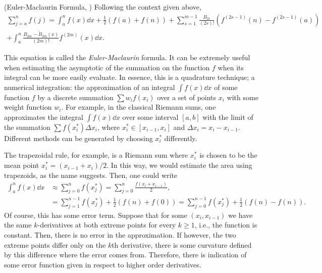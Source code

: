 \begin{teorema} (Euler-Maclaurin Formula,  \cite{NISTMathFunc})
	Following the context given above, 
	\begin{multline}
		\sum_{j=a}^{n} f(j) = \int_{a}^{n} f(x) \dd x + \frac{1}{2} \left(f(a) + f(n)\right) + \sum_{s=1}^{m-1} \frac{B_{2s}}{(2s)!} \left( f^{(2s-1)}(n) - f^{(2s-1)}(a)\right) \\ + \int_{a}^{n} \frac{B_{2m} - \tilde{B}_{2m}(x)}{(2m)!} f^{(2m)}(x) \dd x.
	\end{multline}
\end{teorema}


This equation is called the \textit{Euler-Maclaurin} formula. It can be extremely useful when estimating the asymptotic of the summation on the function $f$ when its integral can be more easily evaluate. In essence, this is a quadrature technique; a numerical integration: the approximation of an integral $\int f(x) \dd x$ of some function $f$ by a discrete summation $\sum w_i f(x_i)$ over a set of points $x_i$ with some weight function $w_i$. For example, in the classical Riemann sums, one approximates the integral $\int f(x) \dd x$ over some interval $[a,b]$ with the limit of the summation $\sum f(x_i^*) \Delta x_i$, where $x_i^* \in [x_{i-1}, x_i]$ and $ \Delta x_i = x_i - x_{i-1}$. Different methods can be generated by choosing $x_i^*$ differently.

The trapezoidal rule, for example, is a Riemann sum where $x_i^*$ is chosen to be the mean point $x_i^* = (x_{i-1} + x_i)/2$. In this way, we would estimate the area using trapezoids, as the name suggests. Then, one could write
\begin{align}
	\int_{a}^{n} f(x) \dd x & \approx \sum_{j = 0}^{n} f(x_j^*) = \sum_{j = 0}^{n} \frac{f(x_{i} + x_{i-1})}{2}, \\
	& = \sum_{j = 1}^{n-1} f(x_j^*) + \frac{1}{2} \left( f(n) + f(0) \right) = \sum_{j = 0}^{n-1} f(x_j^*) + \frac{1}{2} \left( f(n) - f(n) \right) .
\end{align}
Of course, this has some error term. Suppose that for some $(x_i, x_{i-1})$ we have the same $k$-derivatives at both extreme points for every $k\geq 1$, i.e., the function is constant. Then, there is no error in the approximation. If however, the two extreme points differ only on the $k$th derivative, there is some curvature defined by this difference where the error comes from. Therefore, there is indication of some error function given in respect to higher order derivatives.

